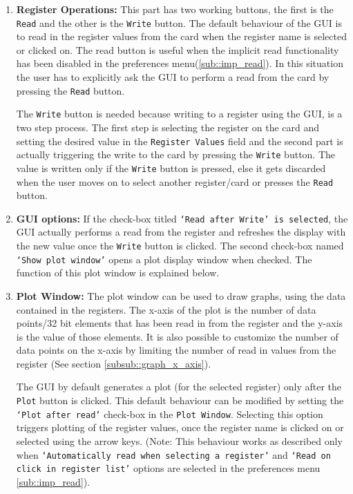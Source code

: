\begin{enumerate}
	\item \textbf{Register Operations:} \label{itm:Register_Operations} This part
    has two working buttons, the first is the \texttt{Read} and the other is the
    \texttt{Write} button. The default behaviour of the GUI is to read in the
    register values from the card when the register name is selected or clicked
    on. The read button is useful when the implicit read functionality has been
    disabled in the preferences menu(\ref{sub::imp_read}). In this situation the
    user has to explicitly ask the GUI to perform a read from the card by
    pressing the \texttt{Read} button.

	The \texttt{Write} button is needed because writing to a register using the GUI,
	is a two step process. The first step is selecting the register on the card and
	setting the desired value in the \texttt{Register Values} field and the second
	part is actually triggering the write to the card by pressing the \texttt{Write}
	button. The value is written only if the \texttt{Write} button is pressed, else
	it gets discarded when the user moves on to select another register/card or
	presses the \texttt{Read} button. 

	\item \textbf{GUI options:} If the check-box titled \texttt{`Read after Write'
    is selected}, the GUI actually performs a read from the register and
    refreshes the display with the new value once the \texttt{Write} button is
    clicked. The second check-box named \texttt{`Show plot window'} opens a plot
    display window when checked. The function of this  plot window is explained
    below.

	\item \textbf{Plot Window:} The plot window can be used to draw graphs, using
    the data contained in the registers. The x-axis of the plot is the number of
    data points/32 bit elements that has been read in from the register and the
    y-axis is the value of those elements. It is also possible to customize the
    number of data points on the x-axis by limiting the number of read in values
    from the register (See section \ref{subsub::graph_x_axis}).

	The GUI by default generates a plot (for the selected register) only after the
	\texttt{Plot} button is clicked. This default behaviour can be modified by
	setting the \texttt{`Plot after read'} check-box in the \texttt{Plot Window}.
	Selecting this option triggers plotting of the register values, once the
	register name is clicked on or selected using the arrow keys. (Note: This
	behaviour works as described only when \texttt{`Automatically read when
	selecting a register'} and \texttt{`Read on click in register list'} options are
	selected in the preferences menu \ref{sub::imp_read}).
	

\end{enumerate}
